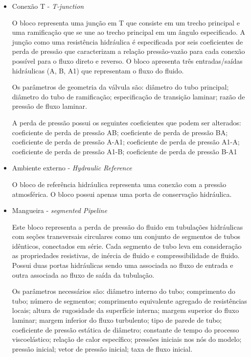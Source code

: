 \begin{itemize}
    \item Conexão T - \textit{T-junction} 
    \par O bloco representa uma junção em T que consiste em um trecho principal e uma ramificação que se une ao trecho principal em um ângulo especificado. A junção como uma resistência hidráulica é especificada por seis coeficientes de perda de pressão que caracterizam a relação pressão-vazão para cada conexão possível para o fluxo direto e reverso. O bloco apresenta três entradas/saídas hidráulicas (A, B, A1) que representam o fluxo do fluido. 
    \par Os parâmetros de geometria da válvula são: diâmetro do tubo principal; diâmetro do tubo de ramificação; especificação de transição laminar; razão de pressão de fluxo laminar.
    \par A perda de pressão possui os seguintes coeficientes que podem ser alterados: coeficiente de perda de pressão AB; coeficiente de perda de pressão BA; coeficiente de perda de pressão A-A1; coeficiente de perda de pressão A1-A; coeficiente de perda de pressão A1-B; coeficiente de perda de pressão B-A1
    
    \item Ambiente externo - \textit{Hydraulic Reference} \par O bloco de referência hidráulica representa uma conexão com a pressão atmosférica. O bloco possui apenas uma porta de conservação hidráulica.
    
    \item Mangueira - \textit{segmented Pipeline}
	\par Este bloco representa a perda de pressão do fluido em tubulações hidráulicas com seções transversais circulares como um conjunto de segmentos de tubos idênticos, conectados em série. Cada segmento de tubo leva em consideração as propriedades resistivas, de inércia de fluido e compressibilidade de fluido. Possui duas portas hidráulicas sendo uma associada ao fluxo de entrada e outra associada ao fluxo de saída da tubulação. 
	\par Os parâmetros necessários são: diâmetro interno do tubo; comprimento do tubo; número de segmentos; comprimento equivalente agregado de resistências locais; altura de rugosidade da superfície interna; margem superior do fluxo laminar; margem inferior do fluxo turbulento; tipo de parede de tubo; coeficiente de pressão estática de diâmetro; constante de tempo do processo viscoelástico; relação de calor específico; pressões iniciais nos nós do modelo; pressão inicial; vetor de pressão inicial; taxa de fluxo inicial.
	

\end{itemize}
